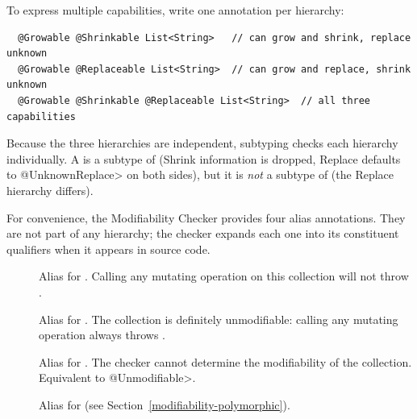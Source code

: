 To express multiple capabilities, write one annotation per hierarchy:

\begin{Verbatim}
  @Growable @Shrinkable List<String>   // can grow and shrink, replace unknown
  @Growable @Replaceable List<String>  // can grow and replace, shrink unknown
  @Growable @Shrinkable @Replaceable List<String>  // all three capabilities
\end{Verbatim}

Because the three hierarchies are independent, subtyping checks each
hierarchy individually.  A  is a
subtype of  (Shrink information is dropped, Replace
defaults to \<@UnknownReplace> on both sides), but it is \emph{not} a
subtype of  (the Replace
hierarchy differs).


For convenience, the Modifiability Checker provides four alias
annotations.  They are not part of any hierarchy; the checker expands
each one into its constituent qualifiers when it appears in source code.

\begin{description}

\item[]
Alias for .
Calling any mutating operation on this collection will not throw
.

\item[]
Alias for .
The collection is definitely unmodifiable: calling any mutating operation
always throws .

\item[]
Alias for .
The checker cannot determine the modifiability of the collection.
Equivalent to \<@Unmodifiable>.

\item[]
Alias for 
(see Section~\ref{modifiability-polymorphic}).

\end{description}

